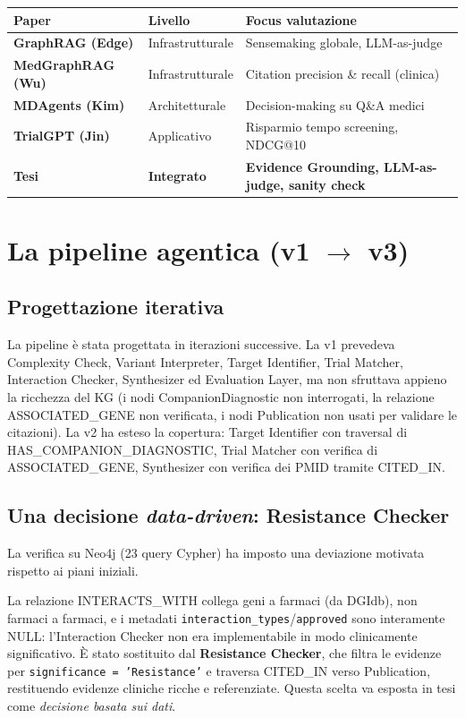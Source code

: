 \documentclass[11pt,a4paper]{article}
\newcommand{\code}[1]{\texttt{\small #1}}
\begin{document}
\begin{center}
\footnotesize
\begin{tabularx}{\textwidth}{@{}>{\bfseries}p{2.7cm} p{1.9cm} X@{}}
\toprule
Paper & Livello & Focus valutazione \\
\midrule
GraphRAG (Edge) & Infrastrutturale & Sensemaking globale, LLM-as-judge \\
MedGraphRAG (Wu) & Infrastrutturale & Citation precision \& recall (clinica) \\
MDAgents (Kim) & Architetturale & Decision-making su Q\&A medici \\
TrialGPT (Jin) & Applicativo & Risparmio tempo screening, NDCG@10 \\
\rowcolor{softbg}\textbf{Tesi} & \textbf{Integrato} & \textbf{Evidence Grounding, LLM-as-judge, sanity check} \\
\bottomrule
\end{tabularx}
\end{center}

\section{La pipeline agentica (v1 $\to$ v3)}

\subsection{Progettazione iterativa}
La pipeline \`e stata progettata in iterazioni successive. La v1 prevedeva Complexity Check, Variant Interpreter, Target Identifier, Trial Matcher, Interaction Checker, Synthesizer ed Evaluation Layer, ma non sfruttava appieno la ricchezza del KG (i nodi CompanionDiagnostic non interrogati, la relazione ASSOCIATED\_GENE non verificata, i nodi Publication non usati per validare le citazioni). La v2 ha esteso la copertura: Target Identifier con traversal di HAS\_COMPANION\_DIAGNOSTIC, Trial Matcher con verifica di ASSOCIATED\_GENE, Synthesizer con verifica dei PMID tramite CITED\_IN.

\subsection{Una decisione \emph{data-driven}: Resistance Checker}
La verifica su Neo4j (23 query Cypher) ha imposto una deviazione motivata rispetto ai piani iniziali.

\begin{warnbox}
La relazione INTERACTS\_WITH collega geni a farmaci (da DGIdb), non farmaci a farmaci, e i metadati \code{interaction\_types}/\code{approved} sono interamente NULL: l'Interaction Checker non era implementabile in modo clinicamente significativo. \`E stato sostituito dal \textbf{Resistance Checker}, che filtra le evidenze per \code{significance = 'Resistance'} e traversa CITED\_IN verso Publication, restituendo evidenze cliniche ricche e referenziate. Questa scelta va esposta in tesi come \emph{decisione basata sui dati}.
\end{warnbox}
\end{document}
